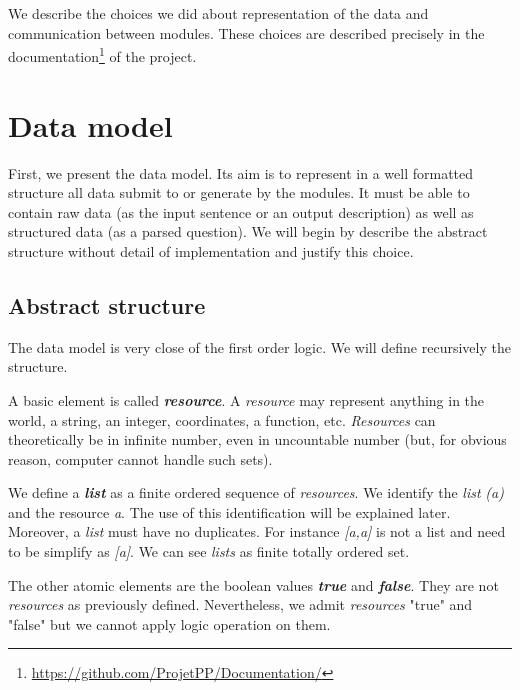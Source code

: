 We describe the choices we did about representation of the data and communication between modules.
These choices are described precisely in the documentation\footnote{\url{https://github.com/ProjetPP/Documentation/}} of the project.

\section{Data model}
\label{rdf}

First, we present the data model. Its aim is to represent in a well formatted structure all data submit to or generate by the modules. It must be able to contain raw data (as the input sentence or an output description) as well as structured data (as a parsed question). We will begin by describe the abstract structure without detail of implementation and justify this choice.

\subsection{Abstract structure}

The data model is very close of the first order logic. We will define recursively the structure.

A basic element is called \textsl{\bf resource}. A \textsl{resource} may represent anything in the world, a string, an integer, coordinates, a function, etc. \textsl{Resources} can theoretically be in infinite number, even in uncountable number (but, for obvious reason, computer cannot handle such sets).

We define a \textsl{\bf list} as a finite ordered sequence of \textsl{resources}. We identify the \textsl{list} \textsl{(a)} and the resource \textsl{a}. The use of this identification will be explained later. Moreover, a \textsl{list} must have no duplicates. For instance \textsl{[a,a]} is not a list and need to be simplify as \textsl{[a]}. We can see \textsl{lists} as finite totally ordered set.

The other atomic elements are the boolean values \textsl{\bf true} and \textsl{\bf false}. They are not \textsl{resources} as previously defined. Nevertheless, we admit \textsl{resources} "true" and "false" but we cannot apply logic operation on them.

